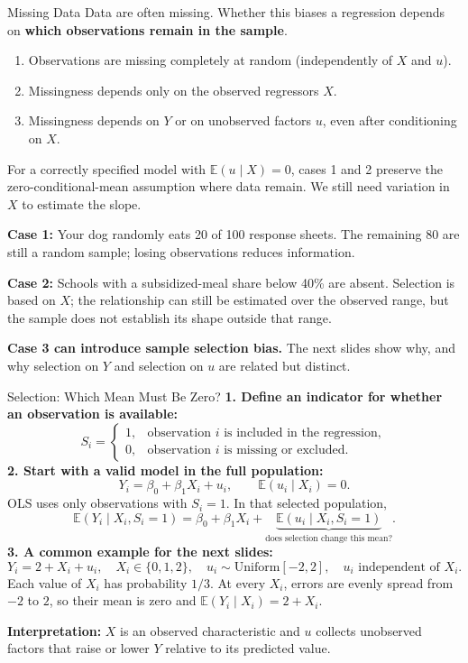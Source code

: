\documentclass[notes,10pt, aspectratio=169]{beamer}
\begin{document}
\begin{frame}{Missing Data}
Data are often missing. Whether this biases a regression depends on \textbf{which observations remain in the sample}.
\begin{enumerate}
    \item Observations are missing completely at random (independently of $X$ and $u$).
    \item Missingness depends only on the observed regressors $X$.
    \item Missingness depends on $Y$ or on unobserved factors $u$, even after conditioning on $X$.
\end{enumerate}
\medskip
For a correctly specified model with $\mathbb{E}(u\mid X)=0$, cases 1 and 2 preserve the zero-conditional-mean assumption where data remain. We still need variation in $X$ to estimate the slope.
\medskip

\textbf{Case 1:} Your dog randomly eats 20 of 100 response sheets. The remaining 80 are still a random sample; losing observations reduces information.
\medskip

\textbf{Case 2:} Schools with a subsidized-meal share below 40\% are absent. Selection is based on $X$; the relationship can still be estimated over the observed range, but the sample does not establish its shape outside that range.
\medskip

\textbf{Case 3 can introduce sample selection bias.} The next slides show why, and why selection on $Y$ and selection on $u$ are related but distinct.
\end{frame}

\begin{frame}{Selection: Which Mean Must Be Zero?}
\small
\textbf{1. Define an indicator for whether an observation is available:}
\[
S_i=\begin{cases}1,&\text{observation $i$ is included in the regression},\\
0,&\text{observation $i$ is missing or excluded}.\end{cases}
\]
\textbf{2. Start with a valid model in the full population:}
\[
Y_i=\beta_0+\beta_1X_i+u_i,
\qquad \mathbb{E}(u_i\mid X_i)=0.
\]
OLS uses only observations with $S_i=1$. In that selected population,
\[
\mathbb{E}(Y_i\mid X_i,S_i=1)
=\beta_0+\beta_1X_i+\underbrace{\mathbb{E}(u_i\mid X_i,S_i=1)}_{\text{does selection change this mean?}}.
\]
\textbf{3. A common example for the next slides:}
\[
\boxed{Y_i=2+X_i+u_i,\quad X_i\in\{0,1,2\},\quad
u_i\sim\mathrm{Uniform}[-2,2],\quad u_i\text{ independent of }X_i.}
\]
Each value of $X_i$ has probability $1/3$. At every $X_i$, errors are evenly spread from $-2$ to $2$, so their mean is zero and $\mathbb{E}(Y_i\mid X_i)=2+X_i$.
\medskip

\textbf{Interpretation:} $X$ is an observed characteristic and $u$ collects unobserved factors that raise or lower $Y$ relative to its predicted value.
\end{frame}
\end{document}
